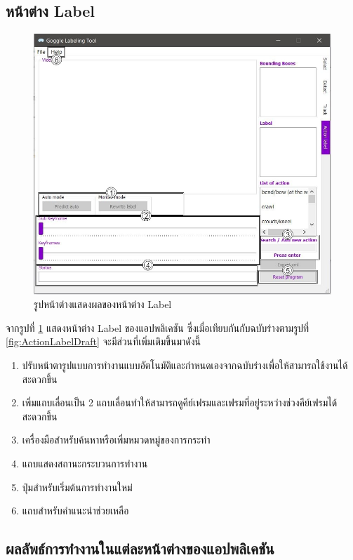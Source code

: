 \subsection*{หน้าต่าง Label}
\begin{figure}[!ht]
  \centering
    \includegraphics[scale=0.4]{chapter4/images/Final_ui/Label.jpg}
    \caption{รูปหน้าต่างแสดงผลของหน้าต่าง Label}
    \label{fig:final_label}
\end{figure}
จากรูปที่ \ref{fig:final_label} แสดงหน้าต่าง Label ของแอปพลิเคชัน ซึ่งเมื่อเทียบกันกับฉบับร่างตามรูปที่ \ref{fig:ActionLabelDraft} จะมีส่วนที่เพิ่มเติมขึ้นมาดังนี้
\begin{enumerate}
	\item ปรับหน้าตารูปแบบการทำงานแบบอัตโนมัติและกำหนดเองจากฉบับร่างเพื่อให้สามารถใช้งานได้สะดวกขึ้น
	\item เพิ่มแถบเลื่อนเป็น 2 แถบเลื่อนทำให้สามารถดูคีย์เฟรมและเฟรมที่อยู่ระหว่างช่วงคีย์เฟรมได้สะดวกขึ้น
	\item เครื่องมือสำหรับค้นหาหรือเพิ่มหมวดหมู่ของการกระทำ
	\item แถบแสดงสถานะกระบวนการทำงาน
	\item ปุ่มสำหรับเริ่มต้นการทำงานใหม่ 
	\item แถบสำหรับคำแนะนำช่วยเหลือ
\end{enumerate}		

\clearpage
\subsection{ผลลัพธ์การทำงานในแต่ละหน้าต่างของแอปพลิเคชัน}
